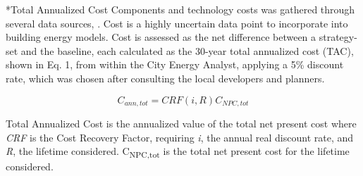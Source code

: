 \documentclass[twocolumn, a4paper,10pt]{article}
\makeatletter
\renewcommand\subsection{\@startsection{subsection}{1}{\z@}{\z@}{\z@}{\normalfont\normalsize\bfseries}}
\renewcommand\subsection{\@startsection{subsection}{1}{\z@}{\z@}{0.1pt}{\normalfont\normalsize\bfseries}}
\makeatother
\begin{document}

\subsection*{Total Annualized Cost}
Components and technology costs was gathered through several data sources, \citep{noauthor_cpcn_2014,schlueter_3for2_2016,salasovich_energy_2016,kegel_life_nodate,gordian_rsmeans_2020}. Cost is a highly uncertain data point to incorporate into building energy models. Cost is assessed as the net difference between a strategy-set and the baseline, each calculated as the 30-year total annualized cost (TAC), shown in Eq. 1, from within the City Energy Analyst, applying a 5\% discount rate, which was chosen after consulting the local developers and planners.

\begin{equation}
C_{ann,tot} = CRF(i,R)C_{NPC,tot}
\end{equation}

Total Annualized Cost is the annualized value of the total net present cost where \textit{CRF} is the Cost Recovery Factor, requiring \textit{i}, the annual real discount rate, and \textit{R}, the lifetime considered. C\textsubscript{NPC,tot} is the total net present cost for the lifetime considered.
\end{document}
